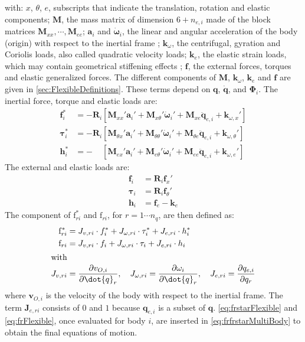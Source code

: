 \documentclass[wes, manuscript]{copernicus}
\renewcommand{\v}[1]{\boldsymbol{#1}}
\newcommand{\m}[1]{\boldsymbol{#1}}
\newcommand{\kanef}{\mathrm{f}}
\begin{document}
with: $x$, $\theta$, $e$, subscripts that indicate the translation, rotation and elastic components; $\m{M}$,  the mass matrix of dimension $6+n_{e,i}$ made of the block matrices $\m{M}_{xx},\cdots,\m{M}_{ee}$; $\v{a}_i$ and $\v{\dot{\omega}}_i$, the linear and angular acceleration of the body (origin) with respect to the inertial frame ; $\v{k}_\omega$, the centrifugal, gyration and Coriolis loads, also called quadratic velocity loads; $\v{k}_e$, the elastic strain loads, which may contain geometrical stiffening effects ; $\v{f}$, the external forces, torques and elastic generalized forces.
The different components of $\m{M}$, $\m{k}_\omega$,  $\m{k}_e$ and $\v{f}$ are given in \autoref{sec:FlexibleDefinitions}.
These terms depend on $\v{q}$, $\v{\dot{q}}$, and $\v{\Phi}_i$.
% 
The inertial force, torque and elastic loads are:
\begin{align}
   \v{f}_{i}^* &= -\m{R}_i\left[\m{M}_{xx}'\v{a}_i' + \m{M}_{x\theta}'\v{\dot{\omega}}_i'  + \m{M}_{xe} \v{\ddot{q}}_{e,i}   + \v{k}_{\omega,x}'     \right]\\
   \v{\tau}_{i}^* &= -\m{R}_i\left[\m{M}_{\theta x}'\v{a}_i' + \m{M}_{\theta \theta}'\v{\dot{\omega}}_i'  + \m{M}_{\theta  e} \v{\ddot{q}}_{e,i}   + \v{k}_{\omega,\theta }'     \right]\\
   \v{h}_{i}^* &= - \phantom{\m{R}_i}      \left[\m{M}_{e x}'\v{a}_i' + \m{M}_{e \theta}'\v{\dot{\omega}}_i'  + \m{M}_{e  e} \v{\ddot{q}}_{e,i}   + \v{k}_{\omega,e }'     \right]
\end{align}
The external and elastic loads are:
\begin{align}
   \v{f}_{i} &= \m{R}_i\v{f}_x'\\
   \v{\tau}_{i} &= \m{R}_i\v{f}_\theta'\\
   \v{h}_{i} &=\v{f}_{e} - \v{k}_{e} 
\end{align}
The component of $\kanef_{ri}^*$ and $\kanef_{ri}$, for $r=1\cdots n_q$, are then defined as:
\begin{align}
   \kanef_{ri}^* &= 
       \v{J}_{v,ri} \cdot \v{f}_i^*  + \v{J}_{\omega,ri} \cdot \v{\tau}_i^*
     + \v{J}_{e,ri} \cdot \v{h}_i^*
    \label{eq:frstarFlexible}
     \\
   \kanef_{ri} &= 
       \v{J}_{v,ri} \cdot \v{f}_i  + \v{J}_{\omega,ri} \cdot \v{\tau}_i
     + \v{J}_{e,ri} \cdot \v{h}_i
    \label{eq:frFlexible}
     \\
     \intertext{with}
    \v{J}_{v,ri} &= \frac{\partial \v{v}_{O,i}}{\partial \dot{q}_r}
    ,\quad
    \v{J}_{\omega,ri} = \frac{\partial \v{\omega}_{i}}{\partial \dot{q}_r}
    ,\quad
    \v{J}_{e,ri} = \frac{\partial \v{q}_{e,i}}{\partial q_r}
    \label{eq:Jacobians}
\end{align}
where $\v{v}_{O,i}$ is the velocity of the body with respect to the inertial frame.
The term $\v{J}_{e,ri}$ consists of $0$ and $1$ because $\v{q}_{e,i}$ is a subset of $\v{q}$.
\autoref{eq:frstarFlexible} and \autoref{eq:frFlexible}, once evaluated for body $i$,
are inserted in \autoref{eq:frfrstarMultiBody} to obtain the final equations of motion.
\end{document}
